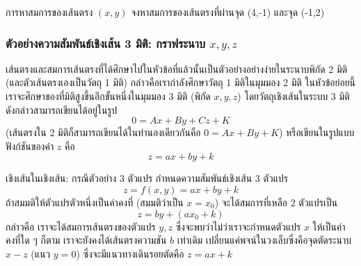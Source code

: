 \newpage
\begin{example}{การหาสมการของเส้นตรง $(x,y)$}{}
    จงหาสมการของเส้นตรงที่ผ่านจุด (4,-1) และจุด (-1,2)
\end{example}

\newpage
\subsubsection{ตัวอย่างความสัมพันธ์เชิงเส้น 3 มิติ: กราฟระนาบ $x,y,z$}\label{subsubsection:plane}
เส้นตรงและสมการเส้นตรงที่ได้ศึกษาไปในหัวข้อที่แล้วนั้นเป็นตัวอย่างอย่างง่ายในระนาบพิกัด 2 มิติ (และตัวเส้นตรงเองเป็นวัตถุ 1 มิติ) กล่าวคือเรากำลังศึกษาวัตถุ 1 มิติในมุมมอง 2 มิติ
ในหัวข้อย่อยนี้เราจะศึกษาของที่มิติสูงขึ้นอีกขั้นหนึ่งในมุมมอง 3 มิติ (พิกัด $x,y,z$) โดยวัตถุเชิงเส้นในระบบ 3 มิติดังกล่าวสามารถเขียนได้อยู่ในรูป
$$
0 = Ax + By + Cz + K
$$
(เส้นตรงใน 2 มิติก็สามารถเขียนได้ในทำนองเดียวกันคือ $0 = Ax + By + K$) หรือเขียนในรูปแบบฟังก์ชันของค่า $z$ คือ
$$
z = ax + by + k
$$


\begin{property}{เชิงเส้นในเชิงเส้น: กรณีตัวอย่าง 3 ตัวแปร}{}
    กำหนดความสัมพันธ์เชิงเส้น 3 ตัวแปร $$z = f(x,y) = ax + by + k$$
    ถ้าสมมติให้ตัวแปรตัวหนึ่งเป็นค่าคงที่ (สมมติว่าเป็น $x = x_0$) จะได้สมการที่เหลือ 2 ตัวแปรเป็น $$z = by + (ax_0 + k)$$
    กล่าวคือ เราจะได้สมการเส้นตรงของตัวแปร $y, z$ ซึ่งจะพบว่าไม่ว่าเราจะกำหนดตัวแปร $x$ ให้เป็นค่าคงที่ใด ๆ ก็ตาม เราจะยังคงได้เส้นตรงความชัน $b$ เท่าเดิม เปลี่ยนแค่พจน์ในวงเล็บซึ่งคือจุดตัดระนาบ $x-z$ (แนว $y = 0$) ซึ่งจะมีแนวทางเดินรอยตัดคือ $z = ax + k$
   
\end{property}


